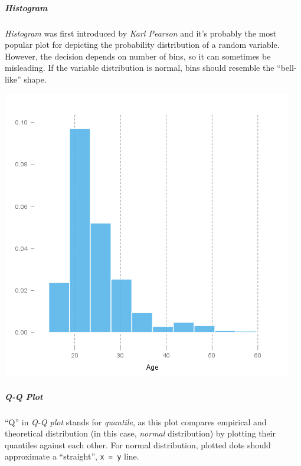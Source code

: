 \documentclass[]{article}
\makeatletter
\def\maxwidth{\ifdim\Gin@nat@width>\linewidth\linewidth
\else\Gin@nat@width\fi}
\let\Oldincludegraphics\includegraphics
\renewcommand{\includegraphics}[1]{\Oldincludegraphics[width=\maxwidth]{#1}}
\makeatother
\begin{document}
\subparagraph{Histogram}

\emph{Histogram} was first introduced by \emph{Karl Pearson} and it's
probably the most popular plot for depicting the probability
distribution of a random variable. However, the decision depends on
number of bins, so it can sometimes be misleading. If the variable
distribution is normal, bins should resemble the ``bell-like'' shape.

\href{/tmp/RtmpeIwHkw/fileb079b29-hires.png}{\includegraphics{4f025d440bf35d40e21208e8b0c58b77.png}}

\subparagraph{Q-Q Plot}

``Q'' in \emph{Q-Q plot} stands for \emph{quantile}, as this plot
compares empirical and theoretical distribution (in this case,
\emph{normal} distribution) by plotting their quantiles against each
other. For normal distribution, plotted dots should approximate a
``straight'', \texttt{x = y} line.
\end{document}
